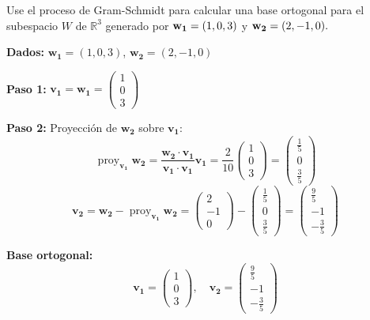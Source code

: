 \begin{prob} 
Use el proceso de Gram-Schmidt para calcular una base ortogonal para el subespacio $W$ de $\mathbb{R}^3$ generado por ${\bf{w_1}}=(1,0,3)$ y ${\bf{w_2}}=(2,-1,0).$
\begin{myproof}
\textbf{Dados:} $\mathbf{w_1} = (1, 0, 3)$, $\mathbf{w_2} = (2, -1, 0)$

\textbf{Paso 1:}  
$\mathbf{v_1} = \mathbf{w_1} = \begin{pmatrix} 1 \\ 0 \\ 3 \end{pmatrix}$

\textbf{Paso 2:}  
Proyección de $\mathbf{w_2}$ sobre $\mathbf{v_1}$:
\[
\operatorname{proy}_{\mathbf{v_1}} \mathbf{w_2} = \frac{\mathbf{w_2} \cdot \mathbf{v_1}}{\mathbf{v_1} \cdot \mathbf{v_1}} \mathbf{v_1} = \frac{2}{10} \begin{pmatrix} 1 \\ 0 \\ 3 \end{pmatrix} = \begin{pmatrix} \frac{1}{5} \\ 0 \\ \frac{3}{5} \end{pmatrix}
\]
\[
\mathbf{v_2} = \mathbf{w_2} - \operatorname{proy}_{\mathbf{v_1}} \mathbf{w_2} = \begin{pmatrix} 2 \\ -1 \\ 0 \end{pmatrix} - \begin{pmatrix} \frac{1}{5} \\ 0 \\ \frac{3}{5} \end{pmatrix} = \begin{pmatrix} \frac{9}{5} \\ -1 \\ -\frac{3}{5} \end{pmatrix}
\]

\textbf{Base ortogonal:}
\[
\boxed{\mathbf{v_1} = \begin{pmatrix} 1 \\ 0 \\ 3 \end{pmatrix}, \quad \mathbf{v_2} = \begin{pmatrix} \frac{9}{5} \\ -1 \\ -\frac{3}{5} \end{pmatrix}}
\]
\end{myproof}
\end{prob}

